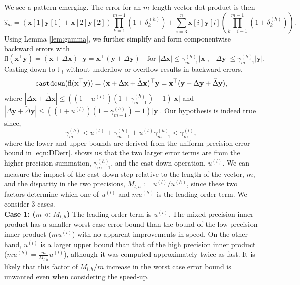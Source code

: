 \documentclass[review,onefignum,onetabnum]{siamart190516}
\newcommand{\F}{\mathbb{F}}
\newcommand{\dd}{\delta}
\newcommand{\bb}[1]{\mathbf{#1}}
\newcommand{\fl}{\mathrm{fl}}
\begin{document}
We see a pattern emerging. 
The error for an $m$-length vector dot product is then
\begin{equation}
\label{eqn:dperr_2}
\hat{s}_m = (\bb{x}[1]\bb{y}[1]+\bb{x}[2]\bb{y}[2])\prod_{k=1}^{m-1}(1+\dd_{k}^{(h)}) + \sum_{i=3}^n \bb{x}[i]\bb{y}[i]\left(\prod_{k=i-1}^{m-1}(1+\dd_{k}^{(h)})\right).
\end{equation}
Using Lemma \ref{lem:gamma}, we further simplify and form componentwise backward errors with
\begin{equation}
\fl(\bb{x}^{\top}\bb{y}) =(\bb{x}+\Delta\bb{x})^{\top}\bb{y} = \bb{x}^{\top}(\bb{y}+\Delta\bb{y})\quad\text{for }|\Delta \bb{x}| \leq \gamma^{(h)}_{m-1}|\bb{x}|,\;\; |\Delta \bb{y}|  \leq \gamma_{m-1}^{(h)}|\bb{y}|. \label{eqn:beforecd}
\end{equation}
Casting down to $\F_l$ without underflow or overflow results in backward errors, 
\begin{equation}
\text{\tt castdown}(\fl(\bb{x}^{\top}\bb{y})) = (\bb{x}+\Delta\bb{x}+\tilde{\Delta}\bb{x})^{\top}\bb{y} = \bb{x}^{\top}(\bb{y}+\Delta\bb{y}+\tilde{\Delta}\bb{y}), \label{eqn:aftercd}
\end{equation}
where $|\Delta\bb{x} + \tilde{\Delta} \bb{x}| \leq ((1+u^{(l)})(1+\gamma_{m-1}^{(h)})-1)|\bb{x}|$ and $|\Delta\bb{y}+\tilde{\Delta} \bb{y}| \leq ((1+u^{(l)})(1+\gamma_{m-1}^{(h)})-1)|\bb{y}|$.
Our hypothesis is indeed true since,
\[\gamma_m^{(h)}<u^{(l)}+\gamma_{m-1}^{(h)}+u^{(l)}\gamma_{m-1}^{(h)}<\gamma_{m}^{(l)},\]
where the lower and upper bounds are derived from the uniform precision error bound in \cref{eqn:DDerr}. 
 shows us that the two larger error terms are from the higher precision summation, $\gamma_{m-1}^{(h)}$, and the cast down operation, $u^{(l)}$.
We can measure the impact of the cast down step relative to the length of the vector, $m$, and the disparity in the two precisions, $M_{l,h}:=u^{(l)}/u^{(h)}$, since these two factors determine which one of $u^{(l)}$ and $mu^{(h)}$ is the leading order term. 
We consider 3 cases.\\
\textbf{Case 1: ($m\ll M_{l,h}$)} The leading order term is $u^{(l)}$.
The mixed precision inner product has a smaller worst case error bound than the bound of the low precision inner product ($mu^{(l)}$) with no apparent improvements in speed.
On the other hand, $u^{(l)}$ is a larger upper bound than that of the high precision inner product ($mu^{(h)}=\frac{m}{M_{l,h}}u^{(l)}$), although it was computed approximately twice as fast. 
It is likely that this factor of $M_{l,h}/m$ increase in the worst case error bound is unwanted even when considering the speed-up.
\end{document}
